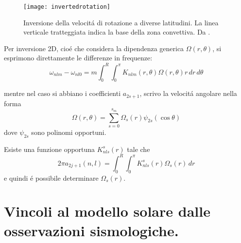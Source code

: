 \documentclass[../main.tex]{subfiles}
\begin{document}
\begin{figure}[!ht]
\centering
\texttt{[image: invertedrotation]}
\caption{Inversione della velocit\'a di rotazione a diverse latitudini. La linea verticale tratteggiata indica la base della zona convettiva. Da \cite{chr02helioseismology}.}
\end{figure}

Per inversione 2D, cio\'e che considera la dipendenza generica $\Omega(r,\theta)$, si esprimono direttamente le differenze in frequenze:
\begin{equation}
\omega_{nlm}-\omega_{nl0}=m\int_0^R\int_0^{\pi}K_{nlm}(r,\theta)\Omega(r,\theta)r\,dr\,d\theta\label{eq:invrot2D}
\end{equation}

mentre nel caso si abbiano i coefficienti $a_{2s+1}$, scrivo la velocit\'a angolare nella forma
\begin{equation}
\Omega(r,\theta)=\sum_{s=0}^{s_m}\Omega_{s}(r)\psi_{2s}(\cos{\theta})\label{eq:angularv15}
\end{equation}
dove $\psi_{2s}$ sono polinomi opportuni.

Esiste una funzione opportuna $K_{nls}^{s}(r)$ tale che
\begin{equation}
2\pi a_{2j+1}(n,l)=\int_0^R\int_0^{\pi}K_{nls}^{s}(r)\Omega_s(r)\,dr
\end{equation}
e quindi \'e possibile determinare $\Omega_s(r)$.


{\let\clearpage\relax\let\cleardoublepage\relax
\chapter{Vincoli al modello solare dalle osservazioni sismologiche.}%
}
\end{document}
